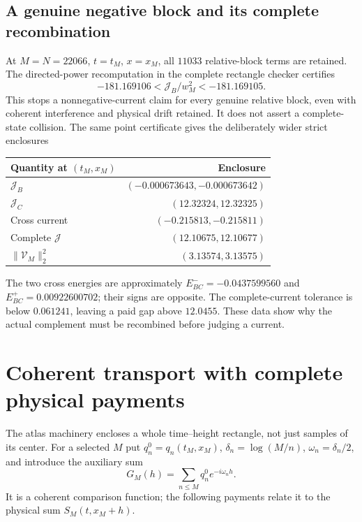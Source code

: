 \documentclass[11pt]{article}
\numberwithin{equation}{section}
\theoremstyle{definition}
\theoremstyle{remark}
\newcommand{\JJ}{\mathcal J}
\begin{document}
\subsection{A genuine negative block and its complete recombination}
At $M=N=22066$, $t=t_M$, $x=x_M$, all $11033$ relative-block
terms are retained. The directed-power recomputation in the complete
rectangle checker certifies \cite{micro2,micro3}
\begin{equation}
 -181.169106<\JJ_B/w_M^2<-181.169105.
 \label{eq:negative-block}
\end{equation}
This stops a nonnegative-current claim for every genuine relative
block, even with coherent interference and physical drift retained.
It does not assert a complete-state collision. The same point
certificate gives the deliberately wider strict enclosures
\begin{center}
\begin{tabular}{lr}
\toprule
Quantity at $(t_M,x_M)$ & Enclosure\\
\midrule
$\JJ_B$ & $(-0.000673643,-0.000673642)$\\
$\JJ_C$ & $(12.32324,12.32325)$\\
Cross current & $(-0.215813,-0.215811)$\\
Complete $\JJ$ & $(12.10675,12.10677)$\\
$\|\mathcal V_M\|_2^2$ & $(3.13574,3.13575)$\\
\bottomrule
\end{tabular}
\end{center}
The two cross energies are approximately
$E_{BC}^-=-0.0437599560$ and $E_{BC}^+=0.00922600702$;
their signs are opposite. The complete-current tolerance is below
$0.061241$, leaving a paid gap above $12.0455$. These data show
why the actual complement must be recombined before judging a current.

\section{Coherent transport with complete physical payments}
\label{sec:transport}
The atlas machinery encloses a whole time--height rectangle, not just
samples of its center. For a selected $M$ put
$q_n^0=q_n(t_M,x_M)$, $\delta_n=\log(M/n)$,
$\omega_n=\delta_n/2$, and introduce the auxiliary sum
\begin{equation}
 G_M(h)=\sum_{n\le M}q_n^0e^{-i\omega_nh}.
 \label{eq:G}
\end{equation}
It is a coherent comparison function; the following payments relate
it to the physical sum $S_M(t,x_M+h)$.
\end{document}
